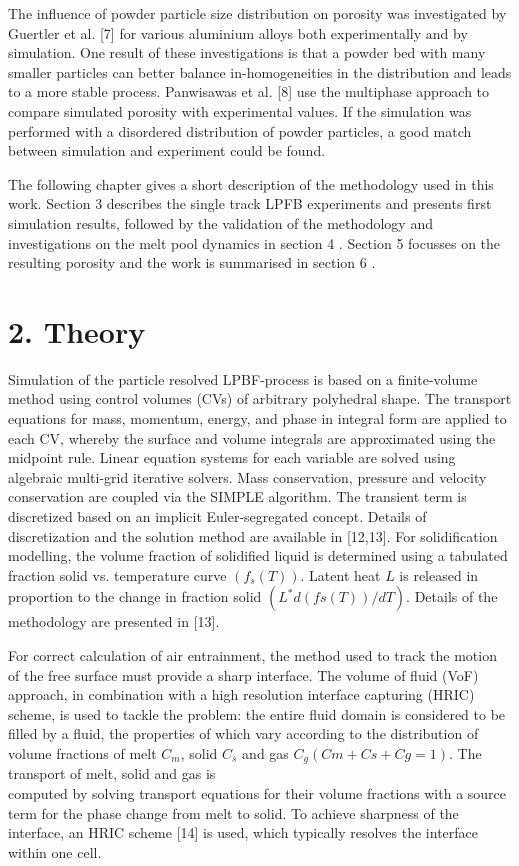 \documentclass[10pt]{article}
\begin{document}
The influence of powder particle size distribution on porosity was investigated by Guertler et al. [7] for various aluminium alloys both experimentally and by simulation. One result of these investigations is that a powder bed with many smaller particles can better balance in-homogeneities in the distribution and leads to a more stable process. Panwisawas et al. [8] use the multiphase approach to compare simulated porosity with experimental values. If the simulation was performed with a disordered distribution of powder particles, a good match between simulation and experiment could be found.

The following chapter gives a short description of the methodology used in this work. Section 3 describes the single track LPFB experiments and presents first simulation results, followed by the validation of the methodology and investigations on the melt pool dynamics in section 4 . Section 5 focusses on the resulting porosity and the work is summarised in section 6 .

\section*{2. Theory}
Simulation of the particle resolved LPBF-process is based on a finite-volume method using control volumes (CVs) of arbitrary polyhedral shape. The transport equations for mass, momentum, energy, and phase in integral form are applied to each CV, whereby the surface and volume integrals are approximated using the midpoint rule. Linear equation systems for each variable are solved using algebraic multi-grid iterative solvers. Mass conservation, pressure and velocity conservation are coupled via the SIMPLE algorithm. The transient term is discretized based on an implicit Euler-segregated concept. Details of discretization and the solution method are available in [12,13]. For solidification modelling, the volume fraction of solidified liquid is determined using a tabulated fraction solid vs. temperature curve $\left(f_{s}(T)\right)$. Latent heat $L$ is released in proportion to the change in fraction solid $\left(L^{*} d(f s(T)) / d T\right)$. Details of the methodology are presented in [13].

For correct calculation of air entrainment, the method used to track the motion of the free surface must provide a sharp interface. The volume of fluid (VoF) approach, in combination with a high resolution interface capturing (HRIC) scheme, is used to tackle the problem: the entire fluid domain is considered to be filled by a fluid, the properties of which vary according to the distribution of volume fractions of melt $C_{m}$, solid $C_{s}$ and gas $C_{g}(C m+C s+C g=1)$. The transport of melt, solid and gas is\\
computed by solving transport equations for their volume fractions with a source term for the phase change from melt to solid. To achieve sharpness of the interface, an HRIC scheme [14] is used, which typically resolves the interface within one cell.
\end{document}
